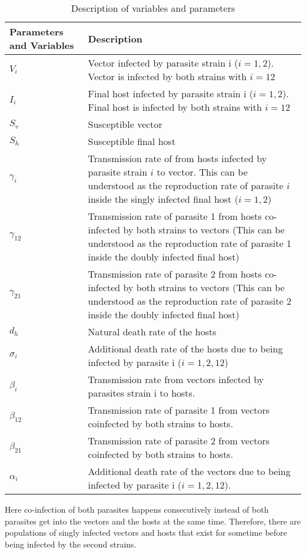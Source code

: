 \documentclass{article}
\begin{document}
\begin{table}
\begin{tabular}{|p{3cm}|p{8cm}|} 
\hline
Parameters and Variables    &  Description  \\
\hline
$V_i$     & Vector infected by parasite strain i ($i = 1, 2$). Vector is infected by both strains with $i = 12$ \\
\hline
$I_i$ & Final host infected by parasite strain i ($i = 1, 2$). Final host is infected by both strains with $i = 12$ \\
\hline
$S_v$ & Susceptible vector \\
\hline
$S_h$ & Susceptible final host \\
\hline
$\gamma_i$ & Transmission rate of from hosts infected by parasite strain $i$ to vector. This can be understood as the reproduction rate of parasite $i$ inside the singly infected final host ($i = 1, 2$) \\
\hline
$\gamma_{12}$ & Transmission rate of parasite 1 from hosts co-infected by both strains to vectors (This can be understood as the reproduction rate of parasite 1 inside the doubly infected final host) \\
\hline
$\gamma_{21}$ & Transmission rate of parasite 2 from hosts co-infected by both strains to vectors (This can be understood as the reproduction rate of parasite 2 inside the doubly infected final host) \\
\hline
$d_h$ & Natural death rate of the hosts \\
\hline
$\sigma_i$ & Additional death rate of the hosts due to being infected by parasite i ($i = 1, 2, 12$) \\
\hline
$\beta_i$ & Transmission rate from vectors infected by parasites strain i to hosts. \\
\hline
$\beta_{12}$ & Transmission rate of parasite 1 from vectors coinfected by both strains to hosts.\\
\hline
$\beta_{21}$ & Transmission rate of parasite 2 from vectors coinfected by both strains to hosts. \\
\hline
$\alpha_i$ & Additional death rate of the vectors due to being infected by parasite i ($i = 1, 2, 12$). \\
\hline
\end{tabular}
\caption{Description of variables and parameters}
\label{table:varpardescription}
\end{table}

Here co-infection of both parasites happens consecutively instead of both parasites get into the vectors and the hosts at the same time. Therefore, there are populations of singly infected vectors and hosts that exist for sometime before being infected by the second strains. 
\end{document}

